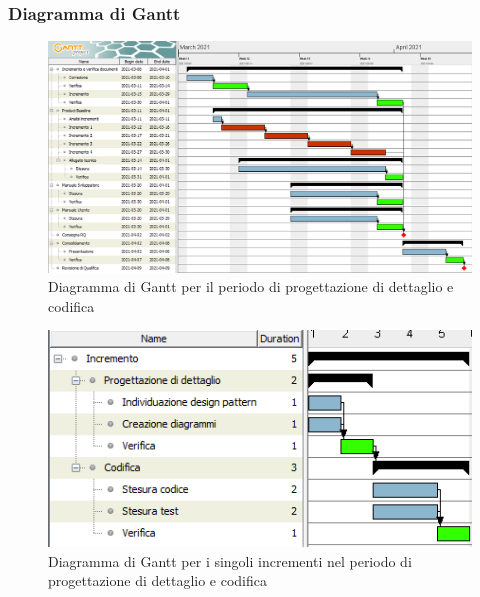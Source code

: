 \subsubsection{Diagramma di Gantt}

\begin{figure}[H]
\centering

\centerline{\includegraphics[scale=0.6]{res/Pianificazione/Gantt/codifica}}
\caption{Diagramma di Gantt per il periodo di progettazione di dettaglio e codifica}
\end{figure}

\begin{figure}[H]
\centering

\centerline{\includegraphics[scale=1]{res/Pianificazione/Gantt/incrementoCodifica}}
\caption{Diagramma di Gantt per i singoli incrementi nel periodo di progettazione di dettaglio e codifica}
\end{figure}
